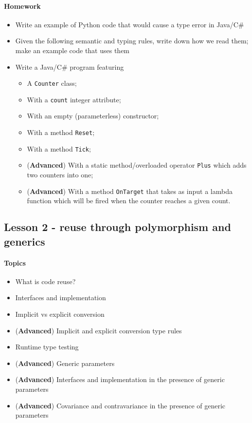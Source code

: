         \paragraph*{Homework}
            \begin{itemize}
                \item Write an example of Python code that would cause a type error in Java/C\#
                \item Given the following semantic and typing rules, write down how we read them; make an example code that uses them
                \item Write a Java/C\# program featuring
                \begin{itemize}
                    \item A \texttt{Counter} class;
                    \item With a \texttt{count} integer attribute;
                    \item With an empty (parameterless) constructor;
                    \item With a method \texttt{Reset};
                    \item With a method \texttt{Tick};
                    \item (\textbf{Advanced}) With a static method/overloaded operator \texttt{Plus} which adds two counters into one;
                    \item (\textbf{Advanced}) With a method \texttt{OnTarget} that takes as input a lambda function which will be fired when the counter reaches a given count.
                \end{itemize}
            \end{itemize}


    \subsection{Lesson 2 - reuse through polymorphism and generics}
        \paragraph*{Topics}
        \begin{itemize}
            \item What is code reuse?
            \item Interfaces and implementation
            \item Implicit vs explicit conversion
            \item (\textbf{Advanced}) Implicit and explicit conversion type rules
            \item Runtime type testing
            \item (\textbf{Advanced}) Generic parameters
            \item (\textbf{Advanced}) Interfaces and implementation in the presence of generic parameters
            \item (\textbf{Advanced}) Covariance and contravariance in the presence of generic parameters
        \end{itemize}

